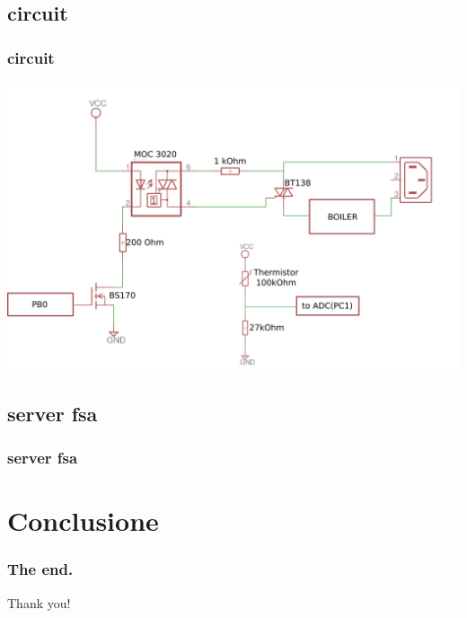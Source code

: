 \documentclass[12pt]{beamer}
\begin{document}
\subsection{circuit}
\begin{frame}
    \frametitle{circuit}
    \includegraphics[width=\textwidth]{eagle.png}
\end{frame}
\subsection{server fsa}
\begin{frame}
    \frametitle{server fsa}
    
\end{frame}




\section{Conclusione}


\begin{frame}
    \frametitle{The end.}
    \begin{center}

        Thank you!
\end{center}
    \end{frame}










\end{document}
